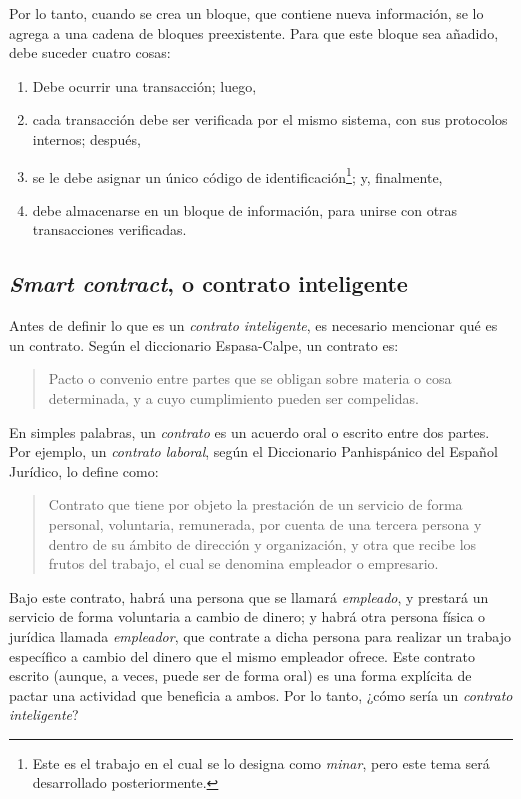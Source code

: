 \documentclass[12pt,a4paper,twoside]{book}
\begin{document}
Por lo tanto, cuando se crea un bloque, que contiene nueva información, se lo agrega a una cadena de bloques preexistente. Para que este bloque sea añadido, debe suceder cuatro cosas:

\begin{enumerate}
\item Debe ocurrir una transacción; luego,
\item cada transacción debe ser verificada por el mismo sistema, con sus protocolos internos; después,
\item se le debe asignar un único código de identificación\footnote{Este es el trabajo en el cual se lo designa como \textit{minar}, pero este tema será desarrollado posteriormente.}; y, finalmente,
\item debe almacenarse en un bloque de información, para unirse con otras transacciones verificadas.
\end{enumerate}

\subsection{\textit{Smart contract}, o contrato inteligente}
Antes de definir lo que es un \textit{contrato inteligente}, es necesario mencionar qué es un contrato. Según el diccionario Espasa-Calpe, un contrato es:

\begin{quotation}
Pacto o convenio entre partes que se obligan sobre materia o cosa determinada, y a cuyo cumplimiento pueden ser compelidas. \cite[pág. 3052]{dic:espasacalpe}
\end{quotation}

En simples palabras, un \textit{contrato} es un acuerdo oral o escrito entre dos partes. Por ejemplo, un \textit{contrato laboral}, según el Diccionario Panhispánico del Español Jurídico, lo define como:

\begin{quotation}
Contrato que tiene por objeto la prestación de un servicio de forma personal, voluntaria, remunerada, por cuenta de una tercera persona y dentro de su ámbito de dirección y organización, y otra que recibe los frutos del trabajo, el cual se denomina empleador o empresario. \cite{rae:contrato}
\end{quotation}

Bajo este contrato, habrá una persona que se llamará \textit{empleado}, y prestará un servicio de forma voluntaria a cambio de dinero; y habrá otra persona física o jurídica llamada \textit{empleador}, que contrate a dicha persona para realizar un trabajo específico a cambio del dinero que el mismo empleador ofrece. Este contrato escrito (aunque, a veces, puede ser de forma oral) es una forma explícita de pactar una actividad que beneficia a ambos. Por lo tanto, ¿cómo sería un \textit{contrato inteligente}?
\end{document}

